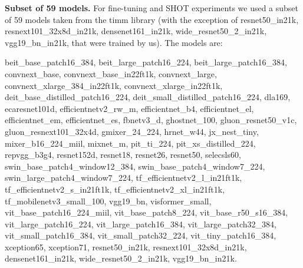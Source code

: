 \documentclass{article}
\begin{document}

\textbf{Subset of 59 models.} For fine-tuning and SHOT experiments we used a subset of 59 models taken from the  timm library (with the exception of resnet50\_in21k, resnext101\_32x8d\_in21k, densenet161\_in21k, wide\_resnet50\_2\_in21k, vgg19\_bn\_in21k, that were trained by us). 
The models are:

beit\_base\_patch16\_384, beit\_large\_patch16\_224, beit\_large\_patch16\_384, convnext\_base, convnext\_base\_in22ft1k, convnext\_large, convnext\_xlarge\_384\_in22ft1k, convnext\_xlarge\_in22ft1k, deit\_base\_distilled\_patch16\_224, deit\_small\_distilled\_patch16\_224, dla169, ecaresnet101d, efficientnetv2\_rw\_m, efficientnet\_b4, efficientnet\_el, efficientnet\_em, efficientnet\_es, fbnetv3\_d, ghostnet\_100, gluon\_resnet50\_v1c, gluon\_resnext101\_32x4d, gmixer\_24\_224, hrnet\_w44, jx\_nest\_tiny, mixer\_b16\_224\_miil, mixnet\_m, pit\_ti\_224, pit\_xs\_distilled\_224, repvgg\_b3g4, resnet152d, resnet18, resnet26, resnet50, selecsls60, swin\_base\_patch4\_window12\_384, swin\_base\_patch4\_window7\_224, swin\_large\_patch4\_window7\_224, tf\_efficientnetv2\_l\_in21ft1k, tf\_efficientnetv2\_s\_in21ft1k, tf\_efficientnetv2\_xl\_in21ft1k, tf\_mobilenetv3\_small\_100, vgg19\_bn, visformer\_small, vit\_base\_patch16\_224\_miil, vit\_base\_patch8\_224, vit\_base\_r50\_s16\_384, vit\_large\_patch16\_224, vit\_large\_patch16\_384, vit\_large\_patch32\_384, vit\_small\_patch16\_384, vit\_small\_patch32\_224, vit\_tiny\_patch16\_384, xception65, xception71, resnet50\_in21k, resnext101\_32x8d\_in21k, densenet161\_in21k, wide\_resnet50\_2\_in21k, vgg19\_bn\_in21k.
\end{document}

